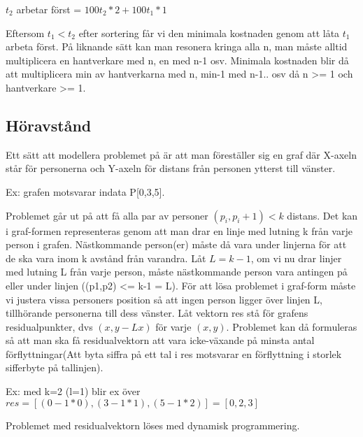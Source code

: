 \documentclass[11pt,a4paper,article,oneside]{memoir}
\begin{document}
$t_2$ arbetar först = $100t_2*2 + 100t_1*1$ 

Eftersom $t_1 < t_2$ efter sortering får vi den minimala kostnaden genom att låta $t_1$ arbeta först.
På liknande sätt kan man resonera kringa alla n, man måste alltid multiplicera en hantverkare med n, en med n-1 osv.
Minimala kostnaden blir då att multiplicera min av hantverkarna med n, min-1 med n-1.. osv då n >= 1 och
hantverkare >= 1.
\newpage

\subsection{Höravstånd}

Ett sätt att modellera problemet på är att man föreställer sig en graf där X-axeln står för personerna och Y-axeln för
distans från personen ytterst till vänster. 

\begin{center}

Ex: grafen motsvarar indata P[0,3,5].
\end{center}

Problemet går ut på att få alla par av personer $(p_i, p_i+1) < k$ distans. 
Det kan i graf-formen representeras genom att man drar en linje med lutning k från varje person i grafen. Nästkommande person(er) måste då vara under linjerna för att de ska vara inom k avstånd från varandra.
Låt $L = k-1$, om vi nu drar linjer med lutning L från varje person, måste nästkommande person vara antingen på eller under linjen
((p1,p2) <= k-1 = L).
För att lösa problemet i graf-form måste vi justera vissa personers position så att ingen person ligger över linjen L, tillhörande 
personerna till dess vänster. Låt vektorn res stå för grafens residualpunkter, dvs $(x, y-Lx)$ för varje $(x,y)$. Problemet 
kan då formuleras så att man ska få residualvektorn att vara icke-växande på minsta antal förflyttningar(Att byta siffra på ett tal i res motsvarar en förflyttning i storlek sifferbyte på tallinjen).

Ex: med k=2 (l=1) blir ex över $res = [(0-1*0),(3-1*1),(5-1*2)] = [0,2,3]$

Problemet med residualvektorn löses med dynamisk programmering. 
\end{document}
